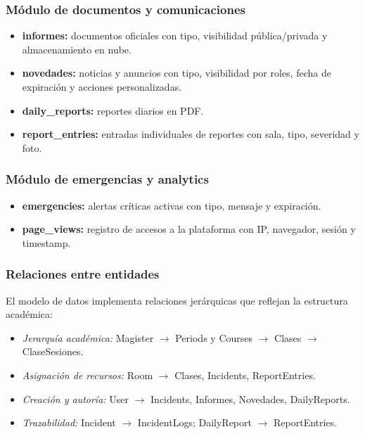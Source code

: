\subsubsection{Módulo de documentos y comunicaciones}

\begin{itemize}
    \item \textbf{informes:} documentos oficiales con tipo, visibilidad pública/privada y almacenamiento en nube.
    \item \textbf{novedades:} noticias y anuncios con tipo, visibilidad por roles, fecha de expiración y acciones personalizadas.
    \item \textbf{daily\_reports:} reportes diarios en PDF.
    \item \textbf{report\_entries:} entradas individuales de reportes con sala, tipo, severidad y foto.
\end{itemize}

\subsubsection{Módulo de emergencias y analytics}

\begin{itemize}
    \item \textbf{emergencies:} alertas críticas activas con tipo, mensaje y expiración.
    \item \textbf{page\_views:} registro de accesos a la plataforma con IP, navegador, sesión y timestamp.
\end{itemize}

\subsubsection{Relaciones entre entidades}

El modelo de datos implementa relaciones jerárquicas que reflejan la estructura académica:

\begin{itemize}
    \item \textit{Jerarquía académica:} Magister $\rightarrow$ Periods y Courses $\rightarrow$ Clases $\rightarrow$ ClaseSesiones.
    \item \textit{Asignación de recursos:} Room $\rightarrow$ Clases, Incidents, ReportEntries.
    \item \textit{Creación y autoría:} User $\rightarrow$ Incidents, Informes, Novedades, DailyReports.
    \item \textit{Trazabilidad:} Incident $\rightarrow$ IncidentLogs; DailyReport $\rightarrow$ ReportEntries.
\end{itemize}

